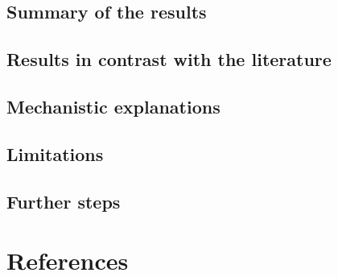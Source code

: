 \documentclass[
  letterpaper,
  DIV=11,
  numbers=noendperiod]{scrartcl}
\begin{document}
\hypertarget{summary-of-the-results}{%
\subsection{Summary of the results}\label{summary-of-the-results}}

\hypertarget{results-in-contrast-with-the-literature}{%
\subsection{Results in contrast with the
literature}\label{results-in-contrast-with-the-literature}}

\hypertarget{mechanistic-explanations}{%
\subsection{Mechanistic explanations}\label{mechanistic-explanations}}

\hypertarget{limitations}{%
\subsection{Limitations}\label{limitations}}

\hypertarget{further-steps}{%
\subsection{Further steps}\label{further-steps}}

\hypertarget{references}{%
\section{References}\label{references}}
\end{document}
